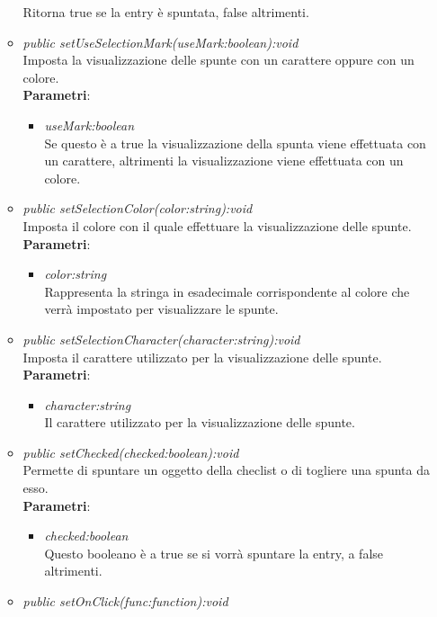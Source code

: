 \begin{itemize}
\begin{itemize}
	Ritorna true se la entry è spuntata, false altrimenti.
	\item \textit{public setUseSelectionMark(useMark:boolean):void}\\
	Imposta la visualizzazione delle spunte con un carattere oppure con un colore.
		\\ \textbf{Parametri}: \begin{itemize}
		\item \textit{useMark:boolean}\\
		Se questo è a true la visualizzazione della spunta viene effettuata con un carattere, altrimenti la visualizzazione viene effettuata con un colore.
		\end{itemize}  
	\item \textit{public setSelectionColor(color:string):void}\\
	Imposta il colore con il quale effettuare la visualizzazione delle spunte.
		\\ \textbf{Parametri}: \begin{itemize}
		\item \textit{color:string}\\
		Rappresenta la stringa in esadecimale corrispondente al colore che verrà impostato per visualizzare le spunte.
		\end{itemize}  
	\item \textit{public setSelectionCharacter(character:string):void}\\
	Imposta il carattere utilizzato per la visualizzazione delle spunte.
		\\ \textbf{Parametri}: \begin{itemize}
		\item \textit{character:string}\\
		Il carattere utilizzato per la visualizzazione delle spunte.
		\end{itemize} 
	\item \textit{public setChecked(checked:boolean):void}\\
	Permette di spuntare un oggetto della checlist o di togliere una spunta da esso.
		\\ \textbf{Parametri}: \begin{itemize}
		\item \textit{checked:boolean}\\
		Questo booleano è a true se si vorrà spuntare la entry, a false altrimenti.
		\end{itemize}  
	\item \textit{public setOnClick(func:function):void}\\

\end{itemize}
\end{itemize}
